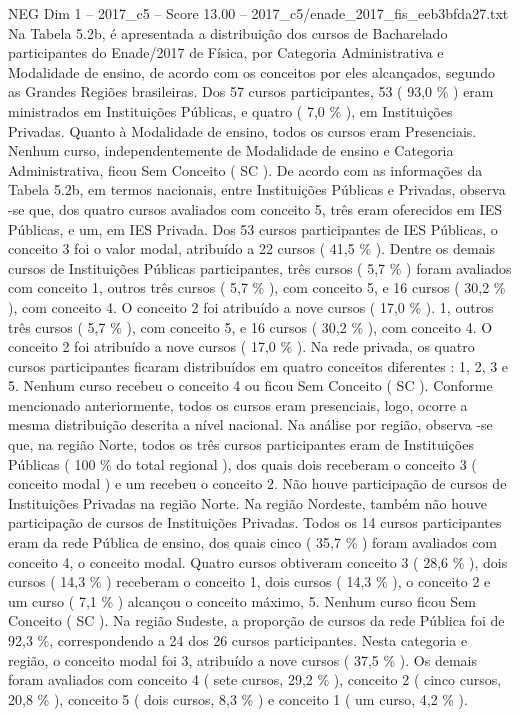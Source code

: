 \begin{textsample}{NEG Dim 1 – 2017\_c5 – Score 13.00 – 2017\_c5/enade\_2017\_fis\_eeb3bfda27.txt}
Na Tabela 5.2b, é apresentada a distribuição dos cursos de Bacharelado participantes do Enade/2017 de Física, por Categoria Administrativa e Modalidade de ensino, de acordo com os conceitos por eles alcançados, segundo as Grandes Regiões brasileiras.
Dos 57 cursos participantes, 53 ( 93,0 \% ) eram ministrados em Instituições Públicas, e quatro ( 7,0 \% ), em Instituições Privadas.
Quanto à Modalidade de ensino, todos os cursos eram Presenciais.
Nenhum curso, independentemente de Modalidade de ensino e Categoria Administrativa, ficou Sem Conceito ( SC ).
De acordo com as informações da Tabela 5.2b, em termos nacionais, entre Instituições Públicas e Privadas, observa -se que, dos quatro cursos avaliados com conceito 5, três eram oferecidos em IES Públicas, e um, em IES Privada.
Dos 53 cursos participantes de IES Públicas, o conceito 3 foi o valor modal, atribuído a 22 cursos ( 41,5 \% ).
Dentre os demais cursos de Instituições Públicas participantes, três cursos ( 5,7 \% ) foram avaliados com conceito 1, outros três cursos ( 5,7 \% ), com conceito 5, e 16 cursos ( 30,2 \% ), com conceito 4.
O conceito 2 foi atribuído a nove cursos ( 17,0 \% ). 1, outros três cursos ( 5,7 \% ), com conceito 5, e 16 cursos ( 30,2 \% ), com conceito 4.
O conceito 2 foi atribuído a nove cursos ( 17,0 \% ).
Na rede privada, os quatro cursos participantes ficaram distribuídos em quatro conceitos diferentes : 1, 2, 3 e 5.
Nenhum curso recebeu o conceito 4 ou ficou Sem Conceito ( SC ).
Conforme mencionado anteriormente, todos os cursos eram presenciais, logo, ocorre a mesma distribuição descrita a nível nacional.
Na análise por região, observa -se que, na região Norte, todos os três cursos participantes eram de Instituições Públicas ( 100 \% do total regional ), dos quais dois receberam o conceito 3 ( conceito modal ) e um recebeu o conceito 2.
Não houve participação de cursos de Instituições Privadas na região Norte.
Na região Nordeste, também não houve participação de cursos de Instituições Privadas.
Todos os 14 cursos participantes eram da rede Pública de ensino, dos quais cinco ( 35,7 \% ) foram avaliados com conceito 4, o conceito modal.
Quatro cursos obtiveram conceito 3 ( 28,6 \% ), dois cursos ( 14,3 \% ) receberam o conceito 1, dois cursos ( 14,3 \% ), o conceito 2 e um curso ( 7,1 \% ) alcançou o conceito máximo, 5.
Nenhum curso ficou Sem Conceito ( SC ).
Na região Sudeste, a proporção de cursos da rede Pública foi de 92,3 \%, correspondendo a 24 dos 26 cursos participantes.
Nesta categoria e região, o conceito modal foi 3, atribuído a nove cursos ( 37,5 \% ).
Os demais foram avaliados com conceito 4 ( sete cursos, 29,2 \% ), conceito 2 ( cinco cursos, 20,8 \% ), conceito 5 ( dois cursos, 8,3 \% ) e conceito 1 ( um curso, 4,2 \% ).

\end{textsample}
